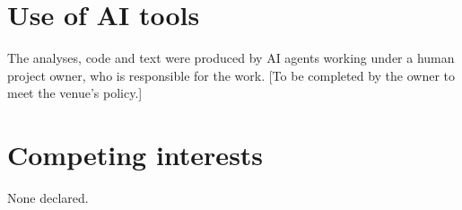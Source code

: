 \documentclass[11pt]{article}
\begin{document}
\section*{Use of AI tools}
The analyses, code and text were produced by AI agents working under a human project owner, who is responsible for the work. [To be completed by the owner to meet the venue's policy.]

\section*{Competing interests}
None declared.



\end{document}
